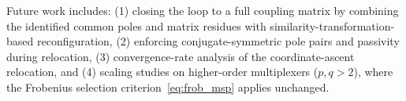 \documentclass[journal]{IEEEtran}%
\begin{document}
Future work includes: (1) closing the loop to a full coupling matrix by combining the identified common poles and matrix residues with similarity-transformation-based reconfiguration, (2) enforcing conjugate-symmetric pole pairs and passivity during relocation, (3) convergence-rate analysis of the coordinate-ascent relocation, and (4) scaling studies on higher-order multiplexers ($p,q > 2$), where the Frobenius selection criterion~\eqref{eq:frob_msp} applies unchanged.




\end{document}
